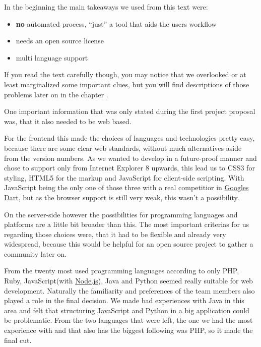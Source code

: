In the beginning the main takeaways we used from this text were:

\begin{itemize}
\item \textbf{no} automated process, \enquote{just} a tool that aids the users workflow
\item needs an open source license
\item multi language support
\end{itemize}

If you read the text carefully though, you may notice that we 
overlooked or at least marginalized some important clues, but you 
will find descriptions of those problems later on in the chapter .

One important information that was only stated during the first project proposal was, that it also needed to be web based.

For the frontend this made the choices of languages and technologies pretty easy, because there are some clear web standards, without much alternatives aside from the version numbers. As we wanted to develop in a future-proof manner and chose to support only from Internet Explorer 8 upwards, this lead us to CSS3 for styling, HTML5 for the markup and JavaScript for client-side scripting. With JavaScript being the only one of those three with a real competitior in \href{http://www.dartlang.org/}{Googles Dart}, but as the browser support is still very weak, 
this wasn't a possibility.

On the server-side however the possibilities for programming languages and platforms are a little bit broader than this. The most
important criterias for us regarding those choices were, that it had to be flexible and already very widespread, because this would be helpful for an open source project to gather a community later on.

From the twenty most used programming languages according to \citet{tiobe} only PHP, Ruby, JavaScript(with \href{http://nodejs.org/}{Node.js}), Java and Python seemed really suitable for web development. Naturally the familiarity and preferences of the team members also played a role in the final decision. We made bad experiences with Java in this area and felt that structuring JavaScript and Python in a big application could be problematic. From the two
languages that were left, the one we had the most experience with and that also has the 
biggest following was PHP, so it made the final cut.

